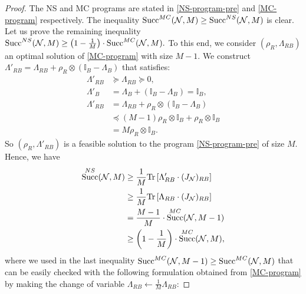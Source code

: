 \documentclass[a4paper,onecolumn,11pt,accepted=2025-10-01]{quantumarticle}
\DeclareMathOperator{\suc}{Succ}
\newcommand*{\dI}{\mathbb{I}}
\newcommand*{\cN}{\mathcal{N}}
\newcommand*{\cS}{\mathcal{S}}
\newcommand*{\tr}[1]{\mathrm{Tr}\left[#1\right]}
\newcommand*{\mge}{\succcurlyeq}
\newcommand*{\mle}{\preccurlyeq}
\begin{document}
\begin{proof}
The NS and MC programs are stated in  \eqref{NS-program-pre} and \eqref{MC-program} respectively. 
\sloppy The inequality $\suc^{\rm{MC}}(\cN,M)\ge  \suc^{\rm{NS}}(\cN,M)$ is clear. Let us prove the remaining inequality $      \suc^{\rm{NS}}(\cN,M) \ge \left(1-\frac{1}{M}\right)\cdot \suc^{\rm{MC}}(\cN,M).$ To this end, we consider $(\rho_R,\Lambda_{RB})$ an optimal solution of \eqref{MC-program} with size $M-1$. We construct $ \Lambda'_{RB} = \Lambda_{RB} + \rho_R\otimes (\dI_B-\Lambda_B)$ that satisfies:
\begin{align}
    \Lambda'_{RB}&\mge \Lambda_{RB}\mge 0,
    \\\Lambda'_{B} &= \Lambda_{B} + (\dI_B-\Lambda_B)=\dI_B,
    \\\Lambda'_{RB} &= \Lambda_{RB} + \rho_R\otimes (\dI_B-\Lambda_B)
    \\&\mle (M-1)\rho_R \otimes  \mathbb{I}_B+ \rho_R\otimes \dI_B 
    \\&= M\rho_R \otimes  \mathbb{I}_B.
\end{align}
So $(\rho_R,\Lambda'_{RB})$ is a feasible solution to the program \eqref{NS-program-pre} of size $M$. Hence, we have
\begin{align}
    \suc_{}^{\rm{NS}}(\cN,M)&\ge \frac{1}{M} \tr{\Lambda'_{RB} \cdot (J_{\cN})_{RB}} 
    \\&\ge \frac{1}{M}\tr{\Lambda_{RB} \cdot (J_{\cN})_{RB}}
    \\&= \frac{M-1}{M}\cdot \suc_{}^{\rm{MC}}(\cN,M-1)
    \\&\ge \left(1-\frac{1}{M}\right)\cdot\suc_{}^{\rm{MC}}(\cN,M),
\end{align}
where we used in the last inequality $\suc_{}^{\rm{MC}}(\cN, M-1)\ge \suc_{}^{\rm{MC}}(\cN,M)$ that can be easily checked with the following formulation obtained from \eqref{MC-program} by making the change of variable $\Lambda_{RB}\leftarrow \frac{1}{M} \Lambda_{RB}$:

\end{proof}
\end{document}
